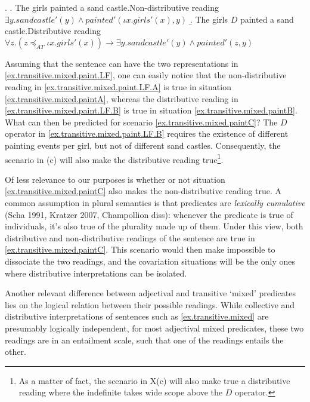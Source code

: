 \documentclass[a4paper, 11pt]{article}
\newcommand{\addMM}[1]{{\leavevmode\color{red}#1}}
\begin{document}
\ex. \label{ex.transitive.mixed.paint.LF}
\a. \label{ex.transitive.mixed.paint.LF.A} The girls painted a sand castle.\hfill{Non-distributive reading}\\
        $\exists y.\mathit{sandcastle}'(y) \wedge \textit{painted}'(\iota x.\mathit{girls}'(x), y)$
\b. \label{ex.transitive.mixed.paint.LF.B} The girls $D$ painted a sand castle.\hfill{Distributive reading}\\
    $\forall z . (z\preceq_{AT} \iota x.\mathit{girls}'(x)) \rightarrow \exists y.\mathit{sand castle}'(y) \wedge \textit{painted}'(z,y)$
    

Assuming that the sentence can have the two representations in \ref{ex.transitive.mixed.paint.LF}, one can easily notice that the non-distributive reading in \ref{ex.transitive.mixed.paint.LF.A} is true in  situation \ref{ex.transitive.mixed.paintA}, whereas the distributive reading in \ref{ex.transitive.mixed.paint.LF.B} is true in situation \ref{ex.transitive.mixed.paintB}. What can then be predicted for scenario \ref{ex.transitive.mixed.paintC}? The $D$ operator in \ref{ex.transitive.mixed.paint.LF.B} requires the existence of different painting events per girl, but not of different sand castles. Consequently, the scenario in (c) will also make the distributive reading true\footnote{As a matter of fact, the scenario in X(c) will also make true a distributive reading where the indefinite takes wide scope above the $D$ operator.}. 

Of less relevance to our purposes is whether or not situation \ref{ex.transitive.mixed.paintC} also makes the non-distributive reading true. A common assumption in plural semantics is that predicates are \emph{lexically cumulative} (Scha 1991, Kratzer 2007, Champollion diss): whenever the predicate is true of individuals, it's also true of the plurality made up of them. Under this view, both distributive and non-distributive readings of the sentence are true in  \ref{ex.transitive.mixed.paintC}. \addMM{This scenario would then make impossible to dissociate the two readings, and  the covariation situations will be the only ones where distributive interpretations can be isolated.} 


\vspace{0.5cm}
Another relevant difference between adjectival and transitive `mixed' predicates lies on the logical relation between their possible readings. 
While collective and distributive interpretations of sentences such as \ref{ex.transitive.mixed} are presumably logically independent, for most adjectival mixed predicates, these two readings are in an entailment scale, such that one of the readings entails the other. 
\end{document}
